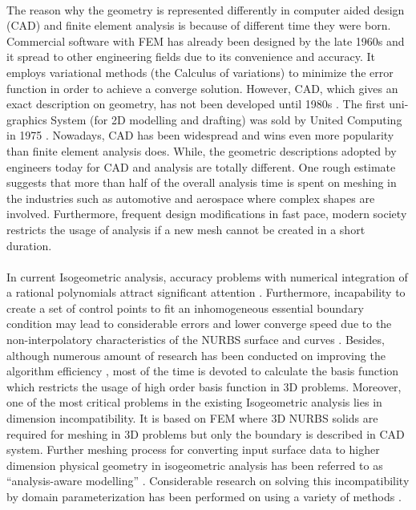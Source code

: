 \paragraph{}
The reason why the geometry is represented differently in computer aided design (CAD) and finite element analysis is because of different time they were born.
Commercial software with FEM has already been designed by the late 1960s and it spread to other engineering fields due to its convenience and accuracy.
It employs variational methods (the Calculus of variations) to minimize the error function in order to achieve a converge solution.
However, CAD, which gives an exact description on geometry, has not been developed until 1980s \cite{Dav2008}.
The first uni-graphics System (for 2D modelling and drafting) was sold by United Computing in 1975 \cite{Ste2010}.
Nowadays, CAD has been widespread and wins even more popularity than finite element analysis does. While, the geometric descriptions adopted by engineers today for CAD and analysis are totally different.
One rough estimate \cite{Hug2005} suggests that more than half of the overall analysis time is spent on meshing in the industries such as automotive and aerospace where complex shapes are involved.
Furthermore, frequent design modifications in fast pace, modern society restricts the usage of analysis if a new mesh cannot be created in a short duration.

\paragraph{}
In current Isogeometric analysis, accuracy problems with numerical integration of a rational polynomials attract significant attention \cite{Hug2010,Sev2011,Aur2012}.
Furthermore, incapability to create a set of control points to fit an inhomogeneous essential boundary condition may lead to considerable errors and lower converge speed due to the non-interpolatory characteristics of the NURBS surface and curves \cite{Wang2010,Wol2011,Koo2013}.
Besides, although numerous amount of research has been conducted on improving the algorithm efficiency \cite{Boo1972,Qin1996,Cho1990,Gra1992,Pan2001,Wang2012}, most of the time is devoted to calculate the basis function which restricts the usage of high order basis function in 3D problems.
Moreover, one of the most critical problems in the existing Isogeometric analysis lies in dimension incompatibility.
It is based on FEM where 3D NURBS solids are required for meshing in 3D problems but only the boundary is described in CAD system.
Further meshing process for converting input surface data to higher dimension physical geometry in isogeometric analysis has been referred to as ``analysis-aware modelling'' \cite{Coh2010}.
Considerable research on solving this incompatibility by domain parameterization has been performed on using a variety of methods \cite{Yang2007,Aig2009,Mar2009,Qian2011}.


